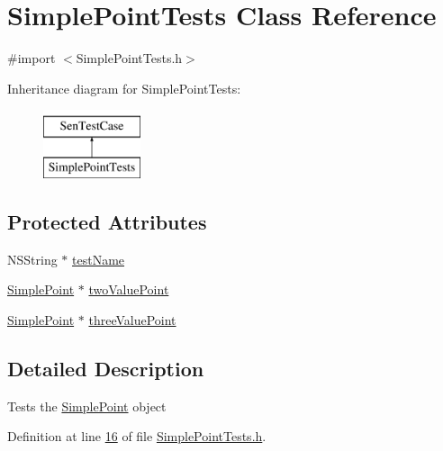\hypertarget{interface_simple_point_tests}{\section{Simple\-Point\-Tests Class Reference}
\label{df/dbc/interface_simple_point_tests}
}


{\ttfamily \#import $<$Simple\-Point\-Tests.\-h$>$}

Inheritance diagram for Simple\-Point\-Tests\-:\begin{figure}[H]
\begin{center}
\leavevmode
\includegraphics[height=2.000000cm]{df/dbc/interface_simple_point_tests}
\end{center}
\end{figure}
\subsection*{Protected Attributes}
\begin{DoxyCompactItemize}
\item 
N\-S\-String $\ast$ \hyperlink{interface_simple_point_tests_a649cb8fc74d522648b3d242a79d67c52}{test\-Name}
\item 
\hyperlink{interface_simple_point}{Simple\-Point} $\ast$ \hyperlink{interface_simple_point_tests_a7de54d867fc86e46d98627fd689508f6}{two\-Value\-Point}
\item 
\hyperlink{interface_simple_point}{Simple\-Point} $\ast$ \hyperlink{interface_simple_point_tests_a3eaccf68ce0b22a31daba1edb2e70762}{three\-Value\-Point}
\end{DoxyCompactItemize}


\subsection{Detailed Description}
Tests the \hyperlink{interface_simple_point}{Simple\-Point} object 

Definition at line \hyperlink{_simple_point_tests_8h_source_l00016}{16} of file \hyperlink{_simple_point_tests_8h_source}{Simple\-Point\-Tests.\-h}.



